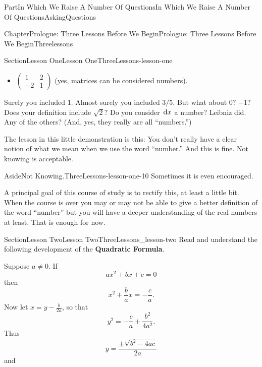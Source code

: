 \documentclass[oneside,10pt,]{book}
\newcommand{\terminology}[1]{\textbf{#1}}
\numberwithin{equation}{part}
\newcommand{\dx}[1]{\,{\rm d}#1}
\newcommand{\amp}{&}
\begin{document}
\begin{partptx}{Part}{In Which We Raise A Number Of Questions}{}{In Which We Raise A Number Of Questions}{}{}{AskingQuestions}
\begin{chapterptx}{Chapter}{Prologue: Three Lessons Before We Begin}{}{Prologue: Three Lessons Before We Begin}{}{}{Threelessons}
\begin{sectionptx}{Section}{Lesson One}{}{Lesson One}{}{}{ThreeLessons-lesson-one}
\begin{itemize}[label=\textbullet]
\item{}\(\begin{pmatrix}
1\amp 2\\
-2\amp 1
\end{pmatrix}\) (yes, matrices can be considered numbers).%
\end{itemize}
%
\par
{} Surely you included \(1\).  Almost surely you included \(3/5\).  But what about \(0?\) \(-1?\) Does your definition include \(\sqrt{2}?\) Do you consider \(\dx{x}\) a number?  Leibniz did.  Any of the others? (And, yes, they really are all ``numbers.'')%
\par
The lesson in this little demonstration is this: You don't really have a clear notion of what we mean when we use the word ``number.'' And this is fine.  Not knowing is acceptable.%
\begin{aside}{Aside}{Not Knowing.}{ThreeLessons-lesson-one-10}%
Sometimes it is even encouraged.%
\end{aside}
A principal goal of this course of study is to rectify this, at least a little bit.  When the course is over you may or may not be able to give a better definition of the word ``number'' but you will have a deeper understanding of the real numbers at least.  That is enough for now.%
\end{sectionptx}
%
%
\typeout{************************************************}
\typeout{************************************************}
%
\begin{sectionptx}{Section}{Lesson Two}{}{Lesson Two}{}{}{ThreeLessons_lesson-two}
Read and understand the following development of the \terminology{Quadratic Formula}.%
\par
Suppose \(a\neq0\).  If%
\begin{equation}
ax^2+bx+c =0\label{EQUATIONeq_QForm1}
\end{equation}
then%
\begin{equation}
x^2+\frac{b}{a}x =-\frac{c}{a}\text{.}\label{EQUATIONeq_QForm2}
\end{equation}
Now let \(x=y-\frac{b}{2a}\), so that%
\begin{equation}
y^2 = -\frac{c}{a} +\frac{b^2}{4a^2}\text{.}\label{EQUATIONeq_QForm3}
\end{equation}
Thus%
\begin{equation}
y = \frac{\pm \sqrt{b^2-4ac}}{2a}\label{EQUATIONeq_QForm4}
\end{equation}
and%
\begin{equation}

\end{equation}
\end{sectionptx}
\end{chapterptx}
\end{partptx}
\end{document}
